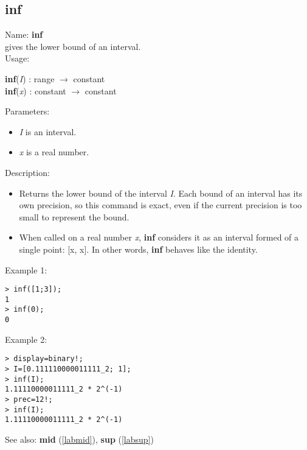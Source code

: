 \subsection{inf}
\label{labinf}
\noindent Name: \textbf{inf}\\
gives the lower bound of an interval.\\
\noindent Usage: 
\begin{center}
\textbf{inf}(\emph{I}) : \textsf{range} $\rightarrow$ \textsf{constant}
\\ 
\textbf{inf}(\emph{x}) : \textsf{constant} $\rightarrow$ \textsf{constant}
\\ 
\end{center}
Parameters: 
\begin{itemize}
\item \emph{I} is an interval.
\item \emph{x} is a real number.
\end{itemize}
\noindent Description: \begin{itemize}

\item Returns the lower bound of the interval \emph{I}. Each bound of an interval has its 
   own precision, so this command is exact, even if the current precision is too 
   small to represent the bound.

\item When called on a real number \emph{x}, \textbf{inf} considers it as an interval formed
   of a single point: [x, x]. In other words, \textbf{inf} behaves like the identity.
\end{itemize}
\noindent Example 1: 
\begin{center}\begin{minipage}{15cm}\begin{Verbatim}[frame=single]
> inf([1;3]);
1
> inf(0);
0
\end{Verbatim}
\end{minipage}\end{center}
\noindent Example 2: 
\begin{center}\begin{minipage}{15cm}\begin{Verbatim}[frame=single]
> display=binary!;
> I=[0.111110000011111_2; 1];
> inf(I);
1.11110000011111_2 * 2^(-1)
> prec=12!;
> inf(I);
1.11110000011111_2 * 2^(-1)
\end{Verbatim}
\end{minipage}\end{center}
See also: \textbf{mid} (\ref{labmid}), \textbf{sup} (\ref{labsup})
